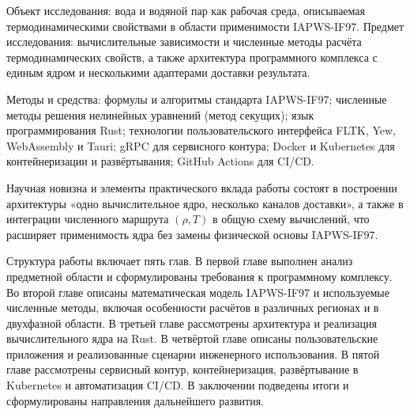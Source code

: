 Объект исследования: вода и водяной пар как рабочая среда, описываемая термодинамическими свойствами в области применимости IAPWS-IF97.
Предмет исследования: вычислительные зависимости и численные методы расчёта термодинамических свойств, а также архитектура программного комплекса с единым ядром и несколькими адаптерами доставки результата.

Методы и средства: формулы и алгоритмы стандарта IAPWS-IF97; численные методы решения нелинейных уравнений (метод секущих); язык программирования Rust; технологии пользовательского интерфейса FLTK, Yew, WebAssembly и Tauri; gRPC для сервисного контура; Docker и Kubernetes для контейнеризации и развёртывания; GitHub Actions для CI/CD.

Научная новизна и элементы практического вклада работы состоят в построении
архитектуры «одно вычислительное ядро, несколько каналов доставки», а также в
интеграции численного маршрута $(\rho, T)$ в общую схему вычислений, что расширяет
применимость ядра без замены физической основы IAPWS-IF97.

Структура работы включает пять глав.
В первой главе выполнен анализ предметной области и сформулированы требования к программному комплексу.
Во второй главе описаны математическая модель IAPWS-IF97 и используемые численные методы, включая особенности расчётов в различных регионах и в двухфазной области.
В третьей главе рассмотрены архитектура и реализация вычислительного ядра на Rust.
В четвёртой главе описаны пользовательские приложения и реализованные сценарии инженерного использования.
В пятой главе рассмотрены сервисный контур, контейнеризация, развёртывание в Kubernetes и автоматизация CI/CD.
В заключении подведены итоги и сформулированы направления дальнейшего развития.
